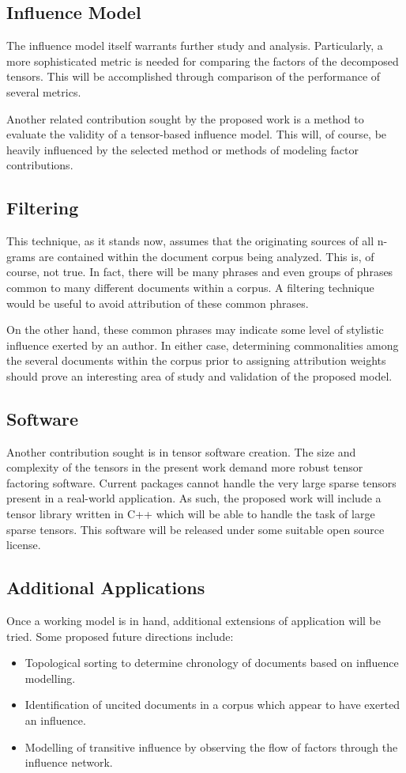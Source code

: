\documentclass{article}
\begin{document}
\subsection{Influence Model}
The influence model itself warrants further study and analysis.
Particularly, a more sophisticated metric is needed for comparing the
factors of the decomposed tensors.  This will be accomplished through
comparison of the performance of several metrics.

Another related contribution sought by the proposed work is a method
to evaluate the validity of a tensor-based influence model.  This
will, of course, be heavily influenced by the selected method or
methods of modeling factor contributions.

\subsection{Filtering}
This technique, as it stands now, assumes that the originating sources
of all n-grams are contained within the document corpus being
analyzed. This is, of course, not true.  In fact, there will be many
phrases and even groups of phrases common to many different documents
within a corpus.  A filtering technique would be useful to avoid
attribution of these common phrases.

On the other hand, these common phrases may indicate some level of
stylistic influence exerted by an author.  In either case, determining
commonalities among the several documents within the corpus prior to
assigning attribution weights should prove an interesting area of
study and validation of the proposed model.

\subsection{Software}
Another contribution sought is in tensor software creation.  The size
and complexity of the tensors in the present work demand more robust
tensor factoring software.  Current packages cannot handle the very
large sparse tensors present in a real-world application.  As such,
the proposed work will include a tensor library written in C++ which
will be able to handle the task of large sparse tensors.  This
software will be released under some suitable open source license.

\subsection{Additional Applications}
Once a working model is in hand, additional extensions of application
will be tried. Some proposed future directions include:
\begin{itemize}
    \item Topological sorting to determine chronology of documents
    based on influence modelling.
    \item Identification of uncited documents in a corpus which appear
    to have exerted an influence.
    \item Modelling of transitive influence by observing the flow of
    factors through the influence network.
\end{itemize}
\end{document}

